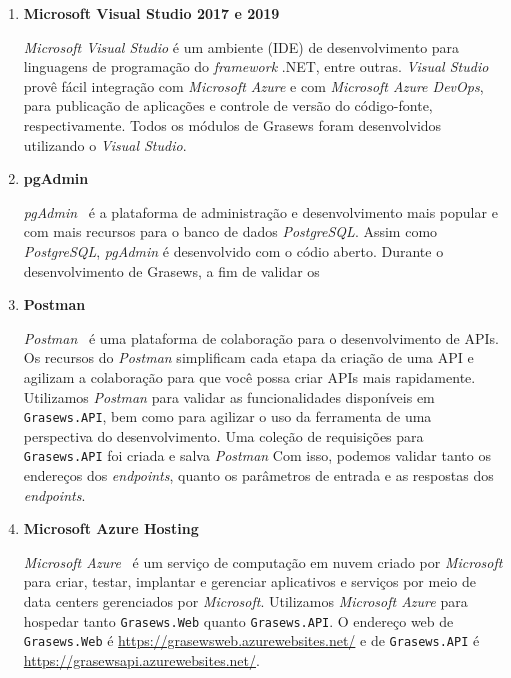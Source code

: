 \begin{enumerate}

  \item \textbf{Microsoft Visual Studio 2017 e 2019}
  
  \textit{Microsoft Visual Studio} é um ambiente (IDE) de desenvolvimento para linguagens de programação do \textit{framework} .NET, entre outras. \textit{Visual Studio} provê fácil integração com \textit{Microsoft Azure} e com \textit{Microsoft Azure DevOps}, para publicação de aplicações e controle de versão do código-fonte, respectivamente. Todos os módulos de Grasews foram desenvolvidos utilizando o \textit{Visual Studio}.
  
  
  \item \textbf{pgAdmin}
  
 \textit{pgAdmin}~\cite{PGADMIN-2019} é a plataforma de administração e desenvolvimento mais popular e com mais recursos para o banco de dados \textit{PostgreSQL}. Assim como \textit{PostgreSQL}, \textit{pgAdmin} é desenvolvido com o códio aberto. Durante o desenvolvimento de Grasews, a fim de validar os
  
  
  \item \textbf{Postman}
  
  \textit{Postman}~\cite{POSTMAN-2019} é uma plataforma de colaboração para o desenvolvimento de APIs. Os recursos do \textit{Postman} simplificam cada etapa da criação de uma API e agilizam a colaboração para que você possa criar APIs mais rapidamente. Utilizamos \textit{Postman} para validar as funcionalidades disponíveis em \texttt{Grasews.API}, bem como para agilizar o uso da ferramenta de uma perspectiva do desenvolvimento. Uma coleção de requisições para \texttt{Grasews.API} foi criada e salva \textit{Postman} Com isso, podemos validar tanto os endereços dos \textit{endpoints}, quanto os parâmetros de entrada e as respostas dos \textit{endpoints}.
  
  
  \item \textbf{Microsoft Azure Hosting}
  
  \textit{Microsoft Azure}~\cite{MICROSOFT-2019-AZURE} é um serviço de computação em nuvem criado por \textit{Microsoft} para criar, testar, implantar e gerenciar aplicativos e serviços por meio de data centers gerenciados por \textit{Microsoft}. Utilizamos \textit{Microsoft Azure} para hospedar tanto \texttt{Grasews.Web} quanto \texttt{Grasews.API}. O endereço web de \texttt{Grasews.Web} é  \href{https://grasewsweb.azurewebsites.net/}{https://grasewsweb.azurewebsites.net/} e de \texttt{Grasews.API} é  \href{https://grasewsapi.azurewebsites.net/}{https://grasewsapi.azurewebsites.net/}.
  

\end{enumerate}
